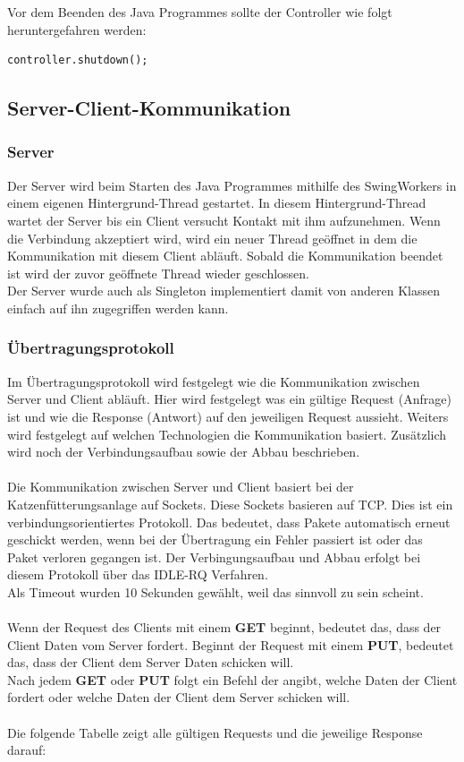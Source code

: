 Vor dem Beenden des Java Programmes sollte der Controller wie folgt heruntergefahren werden:
\begin{lstlisting}[style=JavaStyle, caption=Controller herunterfahren]
	controller.shutdown();
\end{lstlisting}

\subsection{Server-Client-Kommunikation}
\subsubsection{Server}
Der Server wird beim Starten des Java Programmes mithilfe des SwingWorkers in einem eigenen Hintergrund-Thread gestartet. In diesem Hintergrund-Thread wartet der Server bis ein Client versucht Kontakt mit ihm aufzunehmen. Wenn die Verbindung akzeptiert wird, wird ein neuer Thread geöffnet in dem die Kommunikation mit diesem Client abläuft. Sobald die Kommunikation beendet ist wird der zuvor geöffnete Thread wieder geschlossen. 
\\ Der Server wurde auch als Singleton implementiert damit von anderen Klassen einfach auf ihn zugegriffen werden kann.

\subsubsection{Übertragungsprotokoll}
Im Übertragungsprotokoll wird festgelegt wie die Kommunikation zwischen Server und Client abläuft. Hier wird festgelegt was ein gültige Request (Anfrage) ist und wie die Response (Antwort) auf den jeweiligen Request aussieht. Weiters wird festgelegt auf welchen Technologien die Kommunikation basiert. Zusätzlich wird noch der Verbindungsaufbau sowie der Abbau beschrieben.
\\ \\
Die Kommunikation zwischen Server und Client basiert bei der Katzenfütterungsanlage auf Sockets. Diese Sockets basieren auf \ac{TCP}. Dies ist ein verbindungsorientiertes Protokoll. Das bedeutet, dass Pakete automatisch erneut geschickt werden, wenn bei der Übertragung ein Fehler passiert ist oder das Paket verloren gegangen ist. Der Verbingungsaufbau und Abbau erfolgt bei diesem Protokoll über das IDLE-RQ Verfahren.
\\ Als Timeout wurden 10 Sekunden gewählt, weil das sinnvoll zu sein scheint.
\\ \\
Wenn der Request des Clients mit einem \textbf{GET} beginnt, bedeutet das, dass der Client Daten vom Server fordert. Beginnt der Request mit einem \textbf{PUT}, bedeutet das, dass der Client dem Server Daten schicken will.
\\ Nach jedem \textbf{GET} oder \textbf{PUT} folgt ein Befehl der angibt, welche Daten der Client fordert oder welche Daten der Client dem Server schicken will.
\\ \\
Die folgende Tabelle zeigt alle gültigen Requests und die jeweilige Response darauf:


